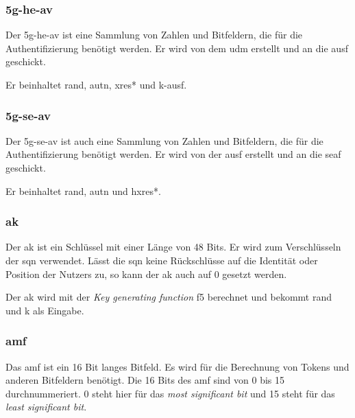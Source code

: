 \subsubsection{\gls{5g-he-av}}
Der \gls{5g-he-av} ist eine Sammlung von Zahlen und Bitfeldern, die für die Authentifizierung benötigt werden.
Er wird von dem \gls{udm} erstellt und an die \gls{ausf} geschickt.

Er beinhaltet \gls{rand}, \gls{autn}, \gls{xres*} und \gls{k-ausf}. %

\subsubsection{\gls{5g-se-av}}
Der \gls{5g-se-av} ist auch eine Sammlung von Zahlen und Bitfeldern, die für die Authentifizierung benötigt werden.
Er wird von der \gls{ausf} erstellt und an die \gls{seaf} geschickt.

Er beinhaltet \gls{rand}, \gls{autn} und \gls{hxres*}. %

\subsubsection{\gls{ak}}
Der \gls{ak} ist ein Schlüssel mit einer Länge von 48 Bits.
Er wird zum Verschlüsseln der \gls{sqn} verwendet. %
Lässt die \gls{sqn} keine Rückschlüsse auf die Identität oder Position der Nutzers zu, so kann der \gls{ak} auch auf 0 gesetzt werden. %

Der \gls{ak} wird mit der \textit{Key generating function} f5 berechnet und bekommt \gls{rand} und \gls{k} als Eingabe. %

\subsubsection{\gls{amf}}
Das \gls{amf} ist ein 16 Bit langes Bitfeld. %
Es wird für die Berechnung von Tokens und anderen Bitfeldern benötigt.
Die 16 Bits des \gls{amf} sind von 0 bis 15 durchnummeriert. %
0 steht hier für das \textit{most significant bit} und 15 steht für das \textit{least significant bit}.

